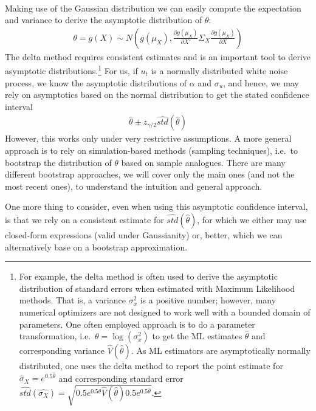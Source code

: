 \begin{enumerate}
\begin{align*}
\end{align*}
Making use of the Gaussian distribution we can easily compute the expectation and variance to derive the asymptotic distribution of \(\theta \):
\begin{align*}
\theta = g(X) \sim N\left(g(\mu_X),\frac{\partial g(\mu_X)}{\partial X'} \Sigma_X \frac{\partial g(\mu_X)}{\partial X}\right)
\end{align*}
The delta method requires consistent estimates and is an important tool to derive asymptotic distributions.\footnote{%
  For example, the delta method is often used to derive the asymptotic distribution of standard errors when estimated with Maximum Likelihood methods.
  That is, a variance \(\sigma_x^2\) is a positive number;
  however, many numerical optimizers are not designed to work well with a bounded domain of parameters.
  One often employed approach is to do a parameter transformation, i.e.\
  \(\theta =\log(\sigma_x^2)\)
  to get the ML estimates \(\hat{\theta}\) and corresponding variance \(\hat{V}(\hat{\theta})\).
  As ML estimators are asymptotically normally distributed,
  one uses the delta method to report the point estimate for \(\hat{\sigma}_X = e^{0.5 \hat{\theta}}\)
  and corresponding standard error \(\hat{std}(\hat{\sigma_X}) = \sqrt{0.5 e^{0.5\hat{\theta}} \hat{V}(\hat{\theta}) 0.5 e^{0.5\hat{\theta}}}\).
}
For us, if \(u_{t}\) is a normally distributed white noise process,
  we know the asymptotic distributions of \(\alpha\) and \(\sigma_u\),
  and hence, we may rely on asymptotics based on the normal distribution
  to get the stated confidence interval
\begin{align*}
\hat{\theta} \pm z_{\gamma/2} \widehat{std}(\hat{\theta})
\end{align*}
However, this works only under very restrictive assumptions.
A more general approach is to rely on simulation-based methods (sampling techniques),
  i.e.\ to bootstrap the distribution of \(\theta \) based on sample analogues.
There are many different bootstrap approaches,
  we will cover only the main ones (and not the most recent ones),
  to understand the intuition and general approach.

One more thing to consider, even when using this asymptotic confidence interval, is that we rely on a consistent estimate for \(\widehat{std}(\hat{\theta})\),
  for which we either may use closed-form expressions (valid under Gaussianity) or, better, which we can alternatively base on a bootstrap approximation.


\end{enumerate}
